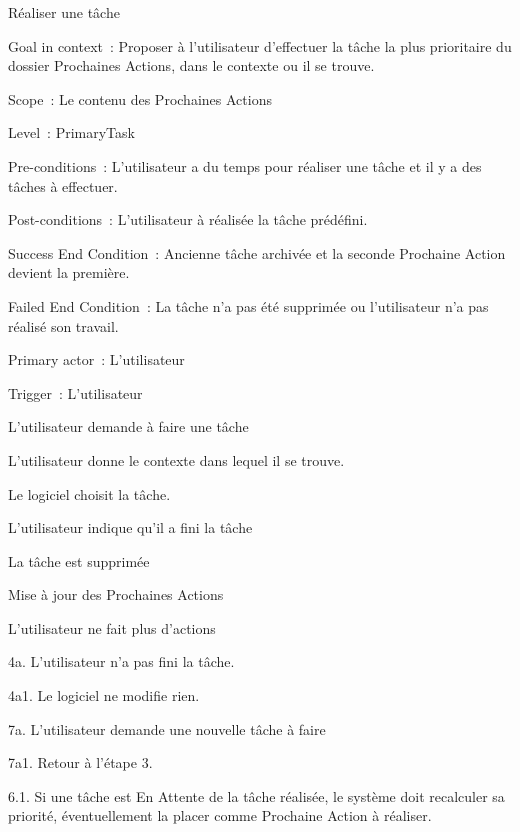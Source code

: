 \begin{usecase}{Réaliser une tâche}
\begin{information}
\item[Goal in context~:] Proposer à l'utilisateur d'effectuer la tâche la plus prioritaire du dossier Prochaines Actions, dans le contexte ou il se trouve.
\item[Scope~:] Le contenu des Prochaines Actions
\item[Level~:] PrimaryTask
\item[Pre-conditions~:] L'utilisateur a du temps pour réaliser une tâche et il y a des tâches à effectuer.
\item[Post-conditions~:] L'utilisateur à réalisée la tâche prédéfini.
\item[Success End Condition~:] Ancienne tâche archivée et la seconde Prochaine Action devient la première.
\item[Failed End Condition~:] La tâche n'a pas été supprimée ou l'utilisateur n'a pas réalisé son travail.
\item[Primary actor~:] L'utilisateur
\item[Trigger~:] L'utilisateur
\\
\end{information}
\begin{scenario}
\item L'utilisateur demande à faire une tâche
\item L'utilisateur donne le contexte dans lequel il se trouve.
\item Le logiciel choisit la tâche.
\item L'utilisateur indique qu'il a fini la tâche
\item La tâche est supprimée
\item Mise à jour des Prochaines Actions
\item L'utilisateur ne fait plus d'actions
\\
\end{scenario}
\begin{extension}
\item[4a.] L'utilisateur n'a pas fini la tâche.
\item[4a1.] Le logiciel ne modifie rien.
\item[7a.] L'utilisateur demande une nouvelle tâche à faire
\item[7a1.] Retour à l'étape 3.
\\
\end{extension}
\begin{variation}
\item[6.1.] Si une tâche est En Attente de la tâche réalisée, le système doit recalculer sa priorité, éventuellement la placer comme Prochaine Action à réaliser.

\end{variation}
\end{usecase}

